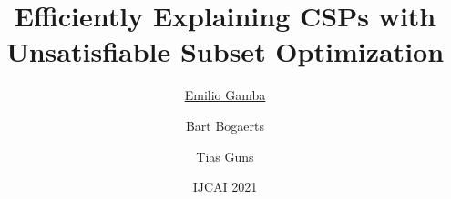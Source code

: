 \documentclass[handout]{beamer}
\title{Efficiently Explaining CSPs with Unsatisfiable Subset Optimization}
\institute[shortinst]
{\inst{1} Vrije Universiteit Brussel, Belgium \\ %
	\inst{2} KULeuven, Belgium \\ %
	\href{mailto:emilio.gamba@vub.be}{\underline{emilio.gamba@vub.be}}, \href{mailto:bart.bogaerts@vub.be}{bart.bogaerts@vub.be}, \href{mailto:tias.guns@kuleuven.be}{tias.guns@kuleuven.be} %
}
\date{IJCAI 2021}
\author{\underline{Emilio Gamba}\inst{1} \and  Bart Bogaerts\inst{1} \and   Tias Guns\inst{1,2}}
\begin{document}
	\begin{frame}
		\maketitle
	\end{frame}
	
\end{document}
